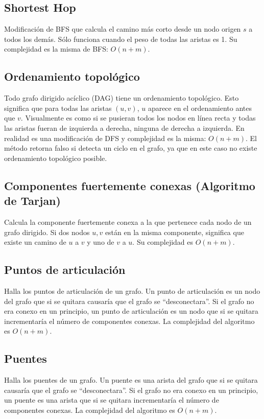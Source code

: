 \documentclass{article}
\begin{document}
\begin{multicols}{2}
	\subsection{Shortest Hop}
	Modificación de BFS que calcula el camino más corto desde un nodo origen \( s \) a todos los demás. Sólo funciona cuando el peso de todas las aristas es 1. Su complejidad es la misma de BFS: \( O(n + m) \).
	
	
	\subsection{Ordenamiento topológico}
	Todo grafo dirigido acíclico (DAG) tiene un ordenamiento topológico. Esto significa que para todas las aristas \( (u,v) \), \(u\) aparece en el ordenamiento antes que \(v\). Visualmente es como si se pusieran todos los nodos en línea recta y todas las aristas fueran de izquierda a derecha, ninguna de derecha a izquierda. En realidad es una modificación de DFS y complejidad es la misma: \( O(n + m) \). El método retorna falso si detecta un ciclo en el grafo, ya que en este caso no existe ordenamiento topológico posible.
	
	
	\subsection{Componentes fuertemente conexas (Algoritmo de Tarjan)}
	Calcula la componente fuertemente conexa a la que pertenece cada nodo de un grafo dirigido. Si dos nodos \( u, v \) están en la misma componente, significa que existe un camino de \( u \) a \( v \) y uno de \( v \) a \( u \). Su complejidad es \( O(n + m) \).
	
	
	\subsection{Puntos de articulación}
	Halla los puntos de articulación de un grafo. Un punto de articulación es un nodo del grafo que si se quitara causaría que el grafo se ``desconectara''. Si el grafo no era conexo en un principio, un punto de articulación es un nodo que si se quitara incrementaría el número de componentes conexas. La complejidad del algoritmo es \( O(n + m) \).
	
	
	\subsection{Puentes}
	Halla los puentes de un grafo.  Un puente es una arista del grafo que si se quitara causaría que el grafo se ``desconectara''. Si el grafo no era conexo en un principio, un puente es una arista que si se quitara incrementaría el número de componentes conexas. La complejidad del algoritmo es \( O(n + m) \).
	
	

\end{multicols}
\end{document}
